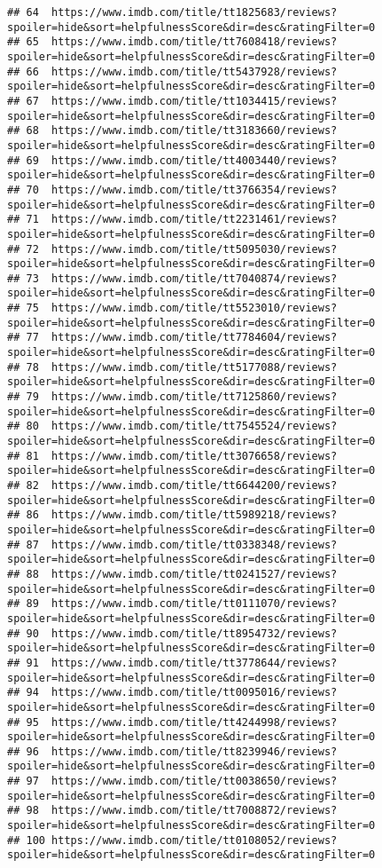 \documentclass[]{article}
\begin{document}
\begin{verbatim}
## 64  https://www.imdb.com/title/tt1825683/reviews?spoiler=hide&sort=helpfulnessScore&dir=desc&ratingFilter=0
## 65  https://www.imdb.com/title/tt7608418/reviews?spoiler=hide&sort=helpfulnessScore&dir=desc&ratingFilter=0
## 66  https://www.imdb.com/title/tt5437928/reviews?spoiler=hide&sort=helpfulnessScore&dir=desc&ratingFilter=0
## 67  https://www.imdb.com/title/tt1034415/reviews?spoiler=hide&sort=helpfulnessScore&dir=desc&ratingFilter=0
## 68  https://www.imdb.com/title/tt3183660/reviews?spoiler=hide&sort=helpfulnessScore&dir=desc&ratingFilter=0
## 69  https://www.imdb.com/title/tt4003440/reviews?spoiler=hide&sort=helpfulnessScore&dir=desc&ratingFilter=0
## 70  https://www.imdb.com/title/tt3766354/reviews?spoiler=hide&sort=helpfulnessScore&dir=desc&ratingFilter=0
## 71  https://www.imdb.com/title/tt2231461/reviews?spoiler=hide&sort=helpfulnessScore&dir=desc&ratingFilter=0
## 72  https://www.imdb.com/title/tt5095030/reviews?spoiler=hide&sort=helpfulnessScore&dir=desc&ratingFilter=0
## 73  https://www.imdb.com/title/tt7040874/reviews?spoiler=hide&sort=helpfulnessScore&dir=desc&ratingFilter=0
## 75  https://www.imdb.com/title/tt5523010/reviews?spoiler=hide&sort=helpfulnessScore&dir=desc&ratingFilter=0
## 77  https://www.imdb.com/title/tt7784604/reviews?spoiler=hide&sort=helpfulnessScore&dir=desc&ratingFilter=0
## 78  https://www.imdb.com/title/tt5177088/reviews?spoiler=hide&sort=helpfulnessScore&dir=desc&ratingFilter=0
## 79  https://www.imdb.com/title/tt7125860/reviews?spoiler=hide&sort=helpfulnessScore&dir=desc&ratingFilter=0
## 80  https://www.imdb.com/title/tt7545524/reviews?spoiler=hide&sort=helpfulnessScore&dir=desc&ratingFilter=0
## 81  https://www.imdb.com/title/tt3076658/reviews?spoiler=hide&sort=helpfulnessScore&dir=desc&ratingFilter=0
## 82  https://www.imdb.com/title/tt6644200/reviews?spoiler=hide&sort=helpfulnessScore&dir=desc&ratingFilter=0
## 86  https://www.imdb.com/title/tt5989218/reviews?spoiler=hide&sort=helpfulnessScore&dir=desc&ratingFilter=0
## 87  https://www.imdb.com/title/tt0338348/reviews?spoiler=hide&sort=helpfulnessScore&dir=desc&ratingFilter=0
## 88  https://www.imdb.com/title/tt0241527/reviews?spoiler=hide&sort=helpfulnessScore&dir=desc&ratingFilter=0
## 89  https://www.imdb.com/title/tt0111070/reviews?spoiler=hide&sort=helpfulnessScore&dir=desc&ratingFilter=0
## 90  https://www.imdb.com/title/tt8954732/reviews?spoiler=hide&sort=helpfulnessScore&dir=desc&ratingFilter=0
## 91  https://www.imdb.com/title/tt3778644/reviews?spoiler=hide&sort=helpfulnessScore&dir=desc&ratingFilter=0
## 94  https://www.imdb.com/title/tt0095016/reviews?spoiler=hide&sort=helpfulnessScore&dir=desc&ratingFilter=0
## 95  https://www.imdb.com/title/tt4244998/reviews?spoiler=hide&sort=helpfulnessScore&dir=desc&ratingFilter=0
## 96  https://www.imdb.com/title/tt8239946/reviews?spoiler=hide&sort=helpfulnessScore&dir=desc&ratingFilter=0
## 97  https://www.imdb.com/title/tt0038650/reviews?spoiler=hide&sort=helpfulnessScore&dir=desc&ratingFilter=0
## 98  https://www.imdb.com/title/tt7008872/reviews?spoiler=hide&sort=helpfulnessScore&dir=desc&ratingFilter=0
## 100 https://www.imdb.com/title/tt0108052/reviews?spoiler=hide&sort=helpfulnessScore&dir=desc&ratingFilter=0
\end{verbatim}
\end{document}
